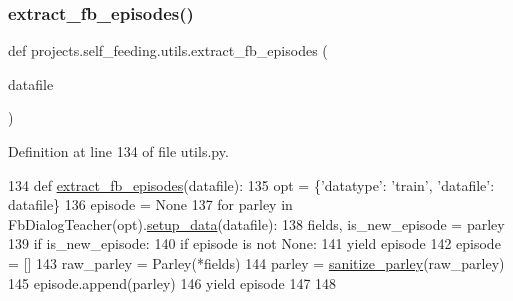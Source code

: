 \mbox{\label{namespaceprojects_1_1self__feeding_1_1utils_a813014fa481008e57bf444f8a3f88d3e}} 
\subsubsection{\texorpdfstring{extract\+\_\+fb\+\_\+episodes()}{extract\_fb\_episodes()}}
{\footnotesize\ttfamily def projects.\+self\+\_\+feeding.\+utils.\+extract\+\_\+fb\+\_\+episodes (\begin{DoxyParamCaption}\item[{}]{datafile }\end{DoxyParamCaption})}



Definition at line 134 of file utils.\+py.


\begin{DoxyCode}
134 \textcolor{keyword}{def }\hyperlink{namespaceprojects_1_1self__feeding_1_1utils_a813014fa481008e57bf444f8a3f88d3e}{extract\_fb\_episodes}(datafile):
135     opt = \{\textcolor{stringliteral}{'datatype'}: \textcolor{stringliteral}{'train'}, \textcolor{stringliteral}{'datafile'}: datafile\}
136     episode = \textcolor{keywordtype}{None}
137     \textcolor{keywordflow}{for} parley \textcolor{keywordflow}{in} FbDialogTeacher(opt).\hyperlink{namespaceparlai_1_1tasks_1_1aqua_1_1agents_a2d4e9f4e80d4edc0646c7e3d52be9f25}{setup\_data}(datafile):
138         fields, is\_new\_episode = parley
139         \textcolor{keywordflow}{if} is\_new\_episode:
140             \textcolor{keywordflow}{if} episode \textcolor{keywordflow}{is} \textcolor{keywordflow}{not} \textcolor{keywordtype}{None}:
141                 \textcolor{keywordflow}{yield} episode
142             episode = []
143         raw\_parley = Parley(*fields)
144         parley = \hyperlink{namespaceprojects_1_1self__feeding_1_1utils_a82b7afe0cb01d90b1de3724f3a6b23fb}{sanitize\_parley}(raw\_parley)
145         episode.append(parley)
146     \textcolor{keywordflow}{yield} episode
147 
148 
\end{DoxyCode}
\mbox{\label{namespaceprojects_1_1self__feeding_1_1utils_a7bfa2fe610a2d0da7968b1a2662e0c23}} 
